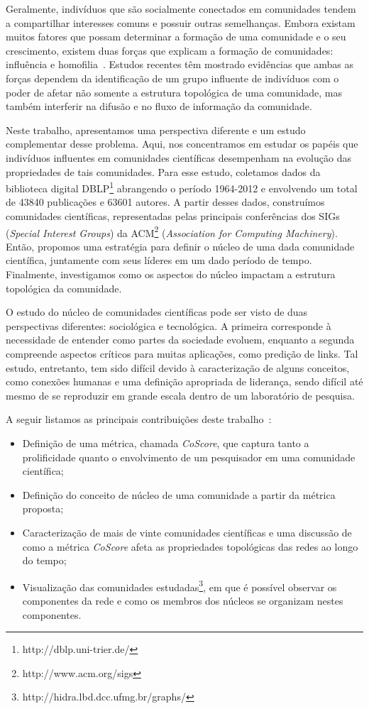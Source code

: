\documentclass[12pt]{article}
\begin{document}
Geralmente, indivíduos que são socialmente conectados em comunidades tendem a compartilhar interesses comuns
e possuir outras semelhanças. Embora existam muitos fatores que possam determinar a formação de uma comunidade
e o seu crescimento, existem duas forças que explicam a formação de comunidades: influência 
e homofilia~\cite{Cha2010}. Estudos recentes 
têm mostrado evidências que ambas as forças
dependem da identificação de um grupo influente 
de indivíduos com o poder de afetar não somente a estrutura topológica de uma comunidade, 
mas também interferir na difusão e no fluxo de informação da comunidade.

Neste trabalho, apresentamos uma perspectiva diferente e um estudo complementar desse problema. 
Aqui, nos concentramos em estudar os papéis que indivíduos influentes em comunidades científicas
desempenham na evolução das propriedades de tais comunidades. Para esse 
estudo, coletamos dados da biblioteca digital DBLP\footnote{http://dblp.uni-trier.de/} abrangendo 
o período 1964-2012 e envolvendo um total de 43840 publicações e 63601 autores.
A partir desses dados, construímos comunidades científicas, representadas pelas principais conferências
dos SIGs (\textit{Special Interest Groups}) da ACM\footnote{http://www.acm.org/sigs}
(\textit{Association for Computing Machinery}). Então, propomos uma estratégia para definir o 
núcleo de uma dada comunidade científica, juntamente com seus líderes em um dado período de 
tempo. Finalmente, investigamos como os aspectos do núcleo impactam a estrutura topológica da comunidade.

O estudo do núcleo de comunidades científicas pode ser visto de duas perspectivas diferentes: 
sociológica e tecnológica. A 
primeira corresponde à necessidade de entender como partes da sociedade evoluem, enquanto a segunda compreende 
aspectos críticos para muitas aplicações, como predição de links. Tal estudo, entretanto, 
tem sido difícil devido à caracterização de alguns conceitos, como conexões humanas e uma definição apropriada 
de liderança, sendo difícil até mesmo de se reproduzir em grande escala dentro de um laboratório de pesquisa.

A seguir listamos as principais contribuições deste trabalho~\cite{Alves2013}:

\begin{itemize}
 \item Definição de uma métrica, chamada \textit{CoScore}, que captura tanto a prolificidade quanto o 
       envolvimento de um pesquisador em uma comunidade científica;
 \item Definição do conceito de núcleo de uma comunidade a partir da métrica 
 proposta;
 \item Caracterização de mais de vinte comunidades científicas e uma discussão de como a métrica \textit{CoScore} afeta 
       as propriedades topológicas das redes ao longo do tempo;
 \item Visualização das comunidades estudadas\footnote{http://hidra.lbd.dcc.ufmg.br/graphs/}, em que é possível observar os componentes da rede e como os membros 
       dos núcleos se organizam nestes componentes.
 
\end{itemize}
\end{document}
